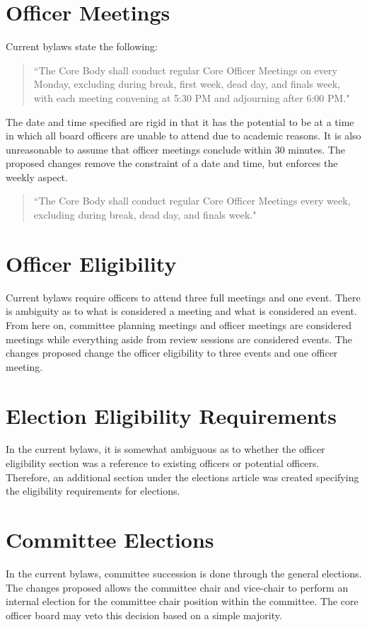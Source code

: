 \documentclass[11pt]{article}
\begin{document}
\section{Officer Meetings}

Current bylaws state the following:

\begin{quote}
	``The Core Body shall conduct regular Core Officer Meetings on every Monday, excluding during break, first week, dead day, and finals week, with each meeting convening at 5:30 PM and adjourning after 6:00 PM."
\end{quote}

\noindent The date and time specified are rigid in that it has the potential to be at a time in which all board officers are unable to attend due to academic reasons. It is also unreasonable to assume that officer meetings conclude within 30 minutes. The proposed changes remove the constraint of a date and time, but enforces the weekly aspect. 

\begin{quote}
	``The Core Body shall conduct regular Core Officer Meetings every week, excluding during break, dead day, and finals week."
\end{quote}

\section{Officer Eligibility}

Current bylaws require officers to attend three full meetings and one event. There is ambiguity as to what is considered a meeting and what is considered an event. From here on, committee planning meetings and officer meetings are considered meetings while everything aside from review sessions are considered events. The changes proposed change the officer eligibility to three events and one officer meeting.

\section{Election Eligibility Requirements}

In the current bylaws, it is somewhat ambiguous as to whether the officer eligibility section was a reference to existing officers or potential officers. Therefore, an additional section under the elections article was created specifying the eligibility requirements for elections. 


\section{Committee Elections}

In the current bylaws, committee succession is done through the general elections. The changes proposed allows the committee chair and vice-chair to perform an internal election for the committee chair position within the committee. The core officer board may veto this decision based on a simple majority.
\end{document}
